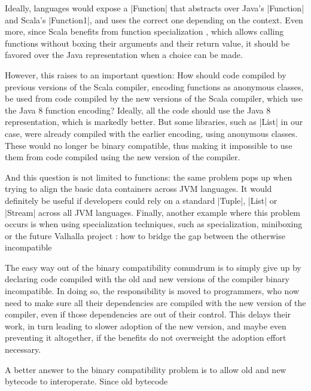 Ideally, languages would expose a |Function| that abstracts over Java's |Function| and Scala's |Function1|, and uses the correct one depending on the context. Even more, since Scala benefits from function specialization \cite{iuli-thesis}, which allows calling functions without boxing their arguments and their return value, it should be favored over the Java representation when a choice can be made. 

However, this raises to an important question: How should code compiled by previous versions of the Scala compiler, encoding functions as anonymous classes, be used from code compiled by the new versions of the Scala compiler, which use the Java 8 function encoding? Ideally, all the code should use the Java 8 representation, which is markedly better. But some libraries, such as |List| in our case, were already compiled with the earlier encoding, using anonymous classes. These would no longer be binary compatible, thus making it impossible to use them from code compiled using the new version of the compiler.

And this question is not limited to functions: the same problem pops up when trying to align the basic data containers across JVM languages. It would definitely be useful if developers could rely on a standard |Tuple|, |List| or |Stream| across all JVM languages. Finally, another example where this problem occurs is when using specialization techniques, such as specialization, miniboxing or the future Valhalla project \cite{}: how to bridge the gap between the otherwise incompatible

The easy way out of the binary compatibility conundrum is to simply give up by declaring code compiled with the old and new versions of the compiler binary incompatible. In doing so, the responsibility is moved to programmers, who now need to make sure all their dependencies are compiled with the new version of the compiler, even if those dependencies are out of their control. This delays their work, in turn leading to slower adoption of the new version, and maybe even preventing it altogether, if the benefits do not overweight the adoption effort necessary.

A better answer to the binary compatibility problem is to allow old and new bytecode to interoperate. Since old bytecode






